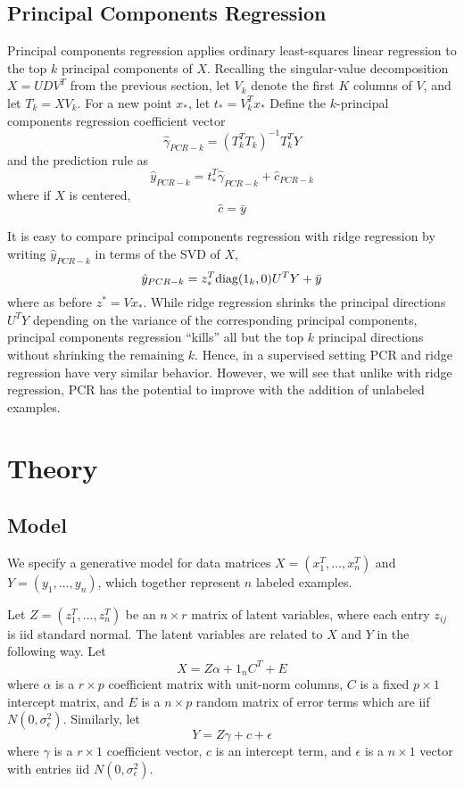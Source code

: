 \documentclass[11pt]{article}
\begin{document}
\subsection{Principal Components Regression}

Principal components regression applies ordinary least-squares linear
regression to the top $k$ principal components of $X$.  Recalling the
singular-value decomposition $X = UDV^T$ from the previous section,
let $V_k$ denote the first $K$ columns of $V$, and let $T_k = XV_k$.
For a new point $x_*$, let $t_* = V_k^T x_*$ Define the $k$-principal
components regression coefficient vector
\[
\hat{\gamma}_{PCR-k} = (T_k^T T_k)^{-1} T_k^T Y
\]
and the prediction rule as
\[
\hat{y}_{PCR-k} = t_*^T \hat{\gamma}_{PCR-k}  + \hat{c}_{PCR-k}
\]
where if $X$ is centered,
\[
\hat{c} = \bar{y}
\]

It is easy to compare principal components regression with ridge
regression by writing $\hat{y}_{PCR-k}$ in terms of the SVD of $X$,
\[
\hat{y}_{PCR-k} = z_*^T \text{diag}(1_k, 0) U^T Y + \bar{y}
\]
where as before $z^* = V x_*$.  While ridge regression shrinks the
principal directions $U^T Y$ depending on the variance of the
corresponding principal components, principal components regression
``kills'' all but the top $k$ principal directions without shrinking
the remaining $k$.  Hence, in a supervised setting PCR and ridge
regression have very similar behavior.  However, we will see that
unlike with ridge regression, PCR has the potential to improve with
the addition of unlabeled examples.

\section{Theory}

\subsection{Model}

We specify a generative model for data matrices $X = (x_1^T,\hdots,x_n^T)$ and $Y = (y_1, \hdots, y_n)$, which
together represent $n$ labeled examples.

Let $Z = (z_1^T,\hdots,z_n^T)$ be an $n \times r$ matrix of latent variables, where each
entry $z_{ij}$ is iid standard normal.  The latent variables are
related to $X$ and $Y$ in the following way.  Let
\[
X = Z\alpha + 1_n C^T + E
\]
where $\alpha$ is a $r \times p$ coefficient matrix with unit-norm
columns, $C$ is a fixed $p \times 1 $ intercept matrix, and $E$ is a
$n \times p$ random matrix of error terms which are iif $N(0,
\sigma_\epsilon^2)$.  Similarly, let
\[
Y = Z\gamma + c + \epsilon
\]
where $\gamma$ is a $r \times 1$ coefficient vector, $c$ is an
intercept term, and $\epsilon$ is a $n \times 1$ vector with entries
iid $N(0, \sigma^2_\epsilon)$.
\end{document}
